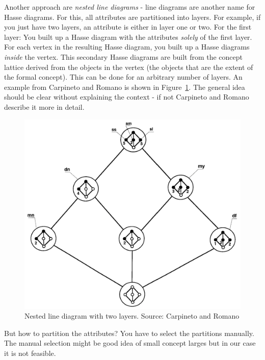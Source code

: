 \documentclass[11pt]{report}
\begin{document}
Another approach are \textit{nested line diagrams} - line diagrams are another name for Hasse diagrams. For this, all attributes are partitioned into layers. For example, if you just have two layers, an attribute is either in layer one or two. For the first layer: You built up a Hasse diagram with the attributes \textit{solely} of the first layer. For each vertex in the resulting Hasse diagram, you built up a Hasse diagrams \textit{inside} the vertex. This secondary Hasse diagrams are built from the concept lattice derived from the objects in the vertex (the objects that are the extent of the formal concept). This can be done for an arbitrary number of layers. An example from Carpineto and Romano \cite{carpineto2004concept} is shown in Figure~\ref{figure:nested}. The general idea should be clear without explaining the context - if not Carpineto and Romano \cite{carpineto2004concept} describe it more in detail. \\

\begin{figure}[!ht]
	\centering
	\includegraphics[width=\linewidth]{./images/nested}
\caption{Nested line diagram with two layers. Source: Carpineto and Romano \cite{carpineto2004concept}}
\label{figure:nested}
\end{figure}
	
But how to partition the attributes? You have to select the partitions manually. The manual selection might be good idea of small concept larges but in our case it is not feasible.
\end{document}
